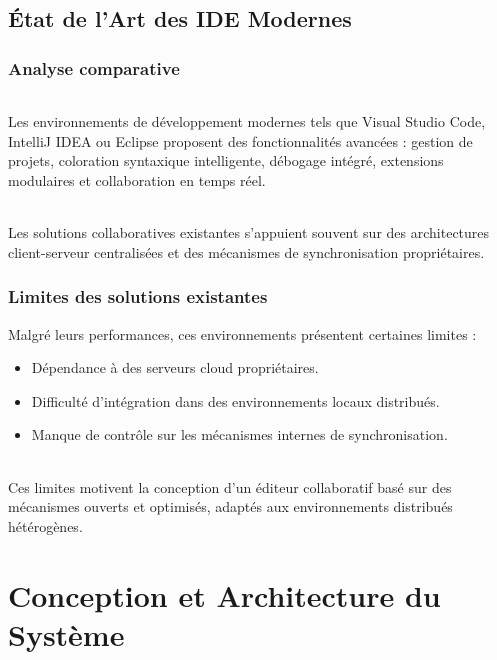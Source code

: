 \documentclass[a4paper,oneside,12pt]{book}
\begin{document}
\chapter{État de l’Art des IDE Modernes}\label{chap3}

\section{Analyse comparative}

\paragraph{}Les environnements de développement modernes tels que Visual Studio Code, IntelliJ IDEA ou Eclipse proposent des fonctionnalités avancées : gestion de projets, coloration syntaxique intelligente, débogage intégré, extensions modulaires et collaboration en temps réel.  

\paragraph{}Les solutions collaboratives existantes s’appuient souvent sur des architectures client-serveur centralisées et des mécanismes de synchronisation propriétaires.

\section{Limites des solutions existantes}

Malgré leurs performances, ces environnements présentent certaines limites :  
\begin{itemize}
	\item[-] Dépendance à des serveurs cloud propriétaires.
	\item[-] Difficulté d’intégration dans des environnements locaux distribués.
	\item[-] Manque de contrôle sur les mécanismes internes de synchronisation.
\end{itemize}

\paragraph{}Ces limites motivent la conception d’un éditeur collaboratif basé sur des mécanismes ouverts et optimisés, adaptés aux environnements distribués hétérogènes.%
\part{\textbf{Conception et Architecture du Système}}
\setcounter{chapter}{0}
\end{document}
